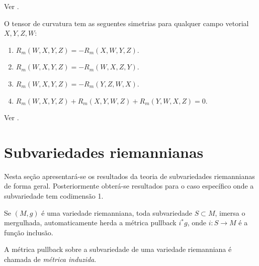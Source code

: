 \begin{demonstracao}
	Ver \cite[Theorem 7.3]{Lee1997}.
\end{demonstracao}



\begin{proposicao}\label{simetrias-del-tensor-de-curvatura}
	O tensor de curvatura tem as seguentes simetrias para qualquer campo vetorial $X,Y,Z,W$:
	\begin{enumerate}
		\item $R_m(W,X,Y,Z) = -R_m(X,W,Y,Z)$.
		\item $R_m(W,X,Y,Z) = -R_m(W,X,Z,Y)$.
		\item $R_m(W,X,Y,Z) = -R_m(Y,Z,W,X)$.
		\item $R_m(W,X,Y,Z) + R_m(X,Y,W,Z) + R_m(Y,W,X,Z) = 0$.
	\end{enumerate}
\end{proposicao}

\begin{demonstracao}
	Ver \cite[Proposition 7.4]{Lee1997}.
\end{demonstracao}








\section{Subvariedades riemannianas}

Nesta seção apresentará-se os resultados da teoria de subvariedades riemannianas de forma geral.
Posteriormente obterá-se resultados para o caso específico onde a subvariedade tem codimensão 1.

\begin{observacao}
	Se $(M,g)$ é uma variedade riemanniana, toda subvariedade $S \subset M$, imersa o mergulhada, automaticamente herda a métrica pullback $i^* g$, onde $i: S \rightarrow M$ é a função inclusão.
\end{observacao}

\begin{definicao}\label{metrica_induzida}
	A métrica pullback sobre a subvariedade de uma variedade riemanniana é chamada de \emph{métrica induzida}.
\end{definicao}

